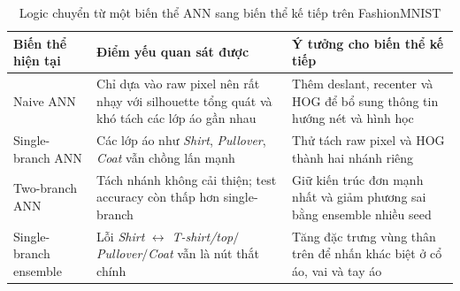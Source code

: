 \begin{table}[H]
\centering
\caption{Logic chuyển từ một biến thể ANN sang biến thể kế tiếp trên FashionMNIST}
\label{tab:fashion-ann-iteration-logic}
\small
\begin{tabularx}{\textwidth}{>{\raggedright\arraybackslash}p{3.2cm} >{\raggedright\arraybackslash}X >{\raggedright\arraybackslash}X}
\toprule
Biến thể hiện tại & Điểm yếu quan sát được & Ý tưởng cho biến thể kế tiếp \\
\midrule
Naive ANN & Chỉ dựa vào raw pixel nên rất nhạy với silhouette tổng quát và khó tách các lớp áo gần nhau & Thêm deslant, recenter và HOG để bổ sung thông tin hướng nét và hình học \\
Single-branch ANN & Các lớp áo như \textit{Shirt}, \textit{Pullover}, \textit{Coat} vẫn chồng lấn mạnh & Thử tách raw pixel và HOG thành hai nhánh riêng \\
Two-branch ANN & Tách nhánh không cải thiện; test accuracy còn thấp hơn single-branch & Giữ kiến trúc đơn mạnh nhất và giảm phương sai bằng ensemble nhiều seed \\
Single-branch ensemble & Lỗi \textit{Shirt} $\leftrightarrow$ \textit{T-shirt/top}$/$\textit{Pullover}$/$\textit{Coat} vẫn là nút thắt chính & Tăng đặc trưng vùng thân trên để nhấn khác biệt ở cổ áo, vai và tay áo \\
\bottomrule
\end{tabularx}
\end{table}
